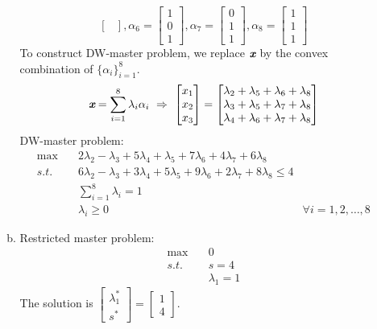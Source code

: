 \begin{enumerate}
\begin{enumerate}[(a)]
$$\begin{bmatrix}
	\end{bmatrix},\alpha_6 = \begin{bmatrix}
	1\\0\\1
	\end{bmatrix},\alpha_7 = \begin{bmatrix}
	0\\1\\1
	\end{bmatrix},\alpha_8 = \begin{bmatrix}
	1\\1\\1
	\end{bmatrix}$$
	To construct DW-master problem, we replace $\textit{\textbf{x}}$ by the convex combination of $\{\alpha_i\}_{i=1}^8$.
	\[
	\textit{\textbf{x}}  = \sum_{i=1}^8\lambda_i\alpha_i ~\Rightarrow~\begin{bmatrix}
	x_1\\x_2\\x_3
	\end{bmatrix}  =\begin{bmatrix}
	\lambda_2 + \lambda_5+\lambda_6+\lambda_8\\
	\lambda_3 + \lambda_5 + \lambda_7+\lambda_8\\
	\lambda_4 + \lambda_6 + \lambda_7 + \lambda_8
	\end{bmatrix}
	\]
	DW-master problem:
	\begin{align*}
	\max \quad &2\lambda_2-\lambda_3+5\lambda_4+\lambda_5+7\lambda_6+4\lambda_7+6\lambda_8\\
	s.t. \quad &6\lambda_2-\lambda_3+3\lambda_4+5\lambda_5+9\lambda_6+2\lambda_7+8\lambda_8\le 4\\
	&\sum_{i=1}^8\lambda_i=1\\
	&\lambda_i \ge 0&\forall i=1,2,\ldots,8
	\end{align*}
	
	\item Restricted master problem:
	\begin{align*}
	\max \quad &0\\
	s.t. \quad &s = 4\\
	&\lambda_1 = 1
	\end{align*}
	The solution is $\begin{bmatrix}
	\lambda_1^*\\s^*
	\end{bmatrix} = \begin{bmatrix}
	1\\4
	\end{bmatrix}$.
	

\end{enumerate}
\end{enumerate}

